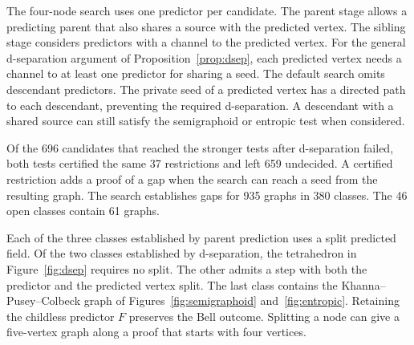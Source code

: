 The four-node search uses one predictor per candidate. The parent stage
allows a predicting parent that also shares a source with the predicted
vertex. The sibling stage considers predictors with a channel to the
predicted vertex. For the general d-separation argument of
Proposition~\ref{prop:dsep}, each predicted vertex needs a channel to
at least one predictor for sharing a seed. The default search omits
descendant predictors. The private seed of a predicted vertex has a
directed path to each descendant, preventing the required d-separation.
A descendant with a shared source can still satisfy the semigraphoid
or entropic test when considered.

Of the 696 candidates that reached the stronger tests after d-separation
failed, both tests certified the same 37 restrictions and left 659
undecided. A certified restriction adds a proof of a gap when the
search can reach a seed from the resulting graph. The search establishes
gaps for 935 graphs in 380 classes. The 46 open classes contain 61 graphs.

Each of the three classes established by parent prediction uses a split
predicted field. Of the two classes established by d-separation, the
tetrahedron in Figure~\ref{fig:dsep} requires no split. The other admits
a step with both the predictor and the predicted vertex split. The last
class contains the Khanna--Pusey--Colbeck graph of
Figures~\ref{fig:semigraphoid} and~\ref{fig:entropic}. Retaining the
childless predictor \(F\) preserves the Bell outcome. Splitting a node
can give a five-vertex graph along a proof that starts with four vertices.

\appendix
